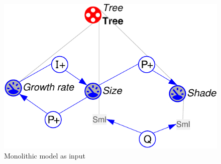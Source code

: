 \documentclass{article} %
\begin{document}

\begin{figure}[ht]
\centering
\includegraphics[scale=0.5]{ts_mono-crop.pdf}
\caption{Monolithic model as input}
\label{ts_mono}
\end{figure}

\end{document}
